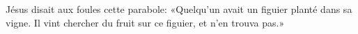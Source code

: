 \encetemps Jésus disait aux foules cette parabole:
	«Quelqu’un avait un figuier planté dans sa vigne.
	Il vint chercher du fruit sur ce figuier, et n’en trouva pas.»

